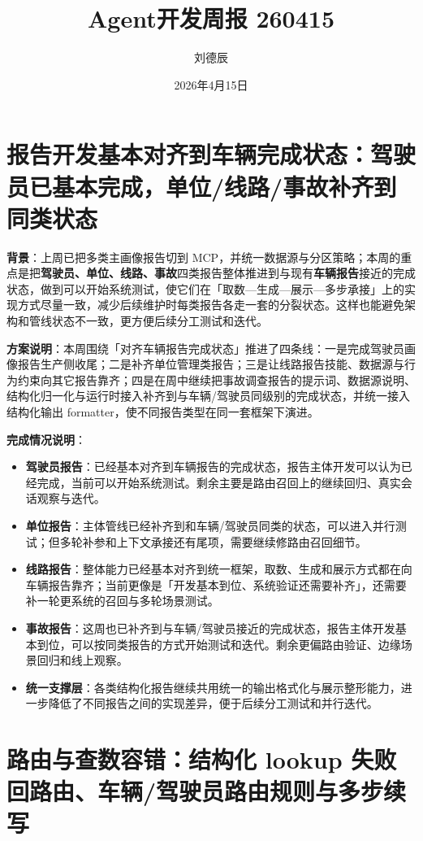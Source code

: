 \documentclass[UTF8]{ctexart}
\title{Agent开发周报 260415}
\author{刘德辰}
\date{2026年4月15日}
\begin{document}
\maketitle

\section{报告开发基本对齐到车辆完成状态：驾驶员已基本完成，单位/线路/事故补齐到同类状态}

\textbf{背景}：上周已把多类主画像报告切到 MCP，并统一数据源与分区策略；本周的重点是把\textbf{驾驶员、单位、线路、事故}四类报告整体推进到与现有\textbf{车辆报告}接近的完成状态，做到可以开始系统测试，使它们在「取数—生成—展示—多步承接」上的实现方式尽量一致，减少后续维护时每类报告各走一套的分裂状态。这样也能避免架构和管线状态不一致，更方便后续分工测试和迭代。

\textbf{方案说明}：本周围绕「对齐车辆报告完成状态」推进了四条线：一是完成驾驶员画像报告生产侧收尾；二是补齐单位管理类报告；三是让线路报告技能、数据源与行为约束向其它报告靠齐；四是在周中继续把事故调查报告的提示词、数据源说明、结构化归一化与运行时接入补齐到与车辆/驾驶员同级别的完成状态，并统一接入结构化输出 formatter，使不同报告类型在同一套框架下演进。

\textbf{完成情况说明}：
\begin{itemize}
\item \textbf{驾驶员报告}：已经基本对齐到车辆报告的完成状态，报告主体开发可以认为已经完成，当前可以开始系统测试。剩余主要是路由召回上的继续回归、真实会话观察与迭代。
\item \textbf{单位报告}：主体管线已经补齐到和车辆/驾驶员同类的状态，可以进入并行测试；但多轮补参和上下文承接还有尾项，需要继续修路由召回细节。
\item \textbf{线路报告}：整体能力已经基本对齐到统一框架，取数、生成和展示方式都在向车辆报告靠齐；当前更像是「开发基本到位、系统验证还需要补齐」，还需要补一轮更系统的召回与多轮场景测试。
\item \textbf{事故报告}：这周也已补齐到与车辆/驾驶员接近的完成状态，报告主体开发基本到位，可以按同类报告的方式开始测试和迭代。剩余更偏路由验证、边缘场景回归和线上观察。
\item \textbf{统一支撑层}：各类结构化报告继续共用统一的输出格式化与展示整形能力，进一步降低了不同报告之间的实现差异，便于后续分工测试和并行迭代。
\end{itemize}

\section{路由与查数容错：结构化 lookup 失败回路由、车辆/驾驶员路由规则与多步续写}
\end{document}
